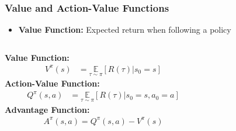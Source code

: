 \begin{frame}
    \frametitle{Value and Action-Value Functions}
    \begin{itemize}
        \item \textbf{Value Function:} Expected return when following a policy
    \end{itemize}
    \vspace{5pt}
    \setlength{\itemsep}{6pt}
    \begin{columns}[T]
        \begin{column}{0.55\textwidth}
            \textbf{Value Function:}
            \begin{align*}
                V^{\pi}(s) &= \underset{\tau \sim \pi}{\mathbb{E}}\left[R(\tau)|s_0 = s\right]
            \end{align*}
            \vspace{0.3cm}
            \textbf{Action-Value Function:}
            \begin{align*}
                Q^{\pi}(s,a) &= \underset{\tau \sim \pi}{\mathbb{E}}\left[R(\tau)|s_0 = s, a_0 = a\right]
            \end{align*}
            \vspace{0.3cm}
            \textbf{Advantage Function:}
            \begin{align*}
                A^{\pi}(s,a) = Q^{\pi}(s,a) - V^{\pi}(s)
            \end{align*}
        \end{column}
        
        \begin{column}{0.35\textwidth}
            \vspace{-1.1cm}
            \begin{figure}
\end{figure}
\end{column}
\end{columns}
\end{frame}
